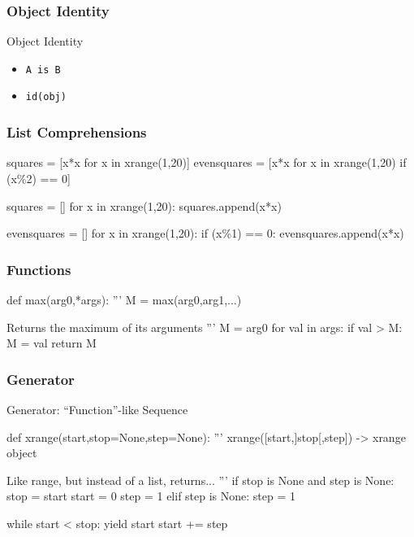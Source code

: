 \begin{frame}[fragile] %
\frametitle{Object Identity}

\begin{block}{Object Identity}
\begin{itemize}
\item \lstinline{A is B}
\item \lstinline{id(obj)}
\end{itemize}
\end{block}

\end{frame}

\begin{frame}[fragile] %
\frametitle{List Comprehensions}

\begin{python}
squares = [x*x for x in xrange(1,20)]
evensquares = [x*x for x in xrange(1,20) if (x\%2) == 0]
\end{python}

\begin{python}
squares = []
for x in xrange(1,20):
    squares.append(x*x)

evensquares = []
for x in xrange(1,20):
    if (x\%1) == 0:
        evensquares.append(x*x)
\end{python}

\end{frame}

\begin{frame}[fragile] %
\frametitle{Functions}

\begin{python}
def max(arg0,*args):
    '''
    M = max(arg0,arg1,...)

    Returns the maximum of its arguments
    '''
    M = arg0
    for val in args:
        if val > M:
            M = val
    return M
\end{python}

\end{frame}

\begin{frame}[fragile] %
\frametitle{Generator}

\begin{block}{Generator: ``Function''-like Sequence}

\begin{python}
def xrange(start,stop=None,step=None):
    '''
    xrange([start,]stop[,step]) -> xrange object

    Like range, but instead of a list, returns...
    '''
    if stop is None and step is None:
        stop = start
        start = 0
        step = 1
    elif step is None:
        step = 1

    while start < stop:
        yield start
        start += step
\end{python}
\end{block}

\end{frame}

